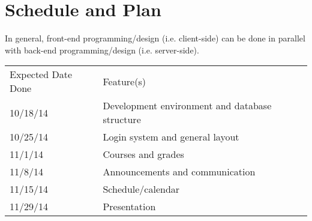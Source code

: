 \documentclass{article}
\begin{document}
\section{Schedule and Plan}

In general, front-end programming/design (i.e. client-side) can be done in
parallel with back-end programming/design (i.e. server-side).

\vspace{10 pt}

\begin{tabular}{ll}
    Expected Date Done&Feature(s)\\
    10/18/14&Development environment and database structure\\
    10/25/14&Login system and general layout\\
    11/1/14&Courses and grades\\
    11/8/14&Announcements and communication\\
    11/15/14&Schedule/calendar\\
    11/29/14&Presentation\\
\end{tabular}


{}

\end{document}
